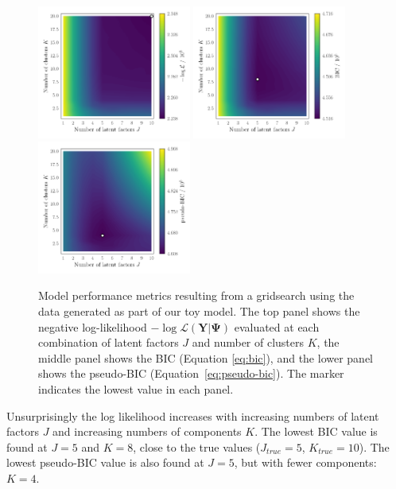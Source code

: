 \documentclass[twocolumn]{aastex61}
\newcommand{\vect}[1]{\boldsymbol{\mathbf{#1}}}
\renewcommand{\vec}[1]{\vect{#1}}
\newcommand{\data}{\textbf{Y}}
\newcommand{\NumLatentFactors}{J}
\newcommand{\NumComponents}{K}
\begin{document}
\begin{figure}
	\includegraphics[width=0.45\textwidth]{experiments/toy-ll-contours.png}
	\includegraphics[width=0.45\textwidth]{experiments/toy-bic-contours.png}
	\includegraphics[width=0.45\textwidth]{experiments/toy-pseudobic-contours.png}
    \caption{Model performance metrics resulting from a gridsearch using the
    		 data generated as part of our toy model. The top 
		 	 panel shows the negative log-likelihood 
			 $-\log{\mathcal{L}\left(\data|\vec\Psi\right)}$ 
			 evaluated at each combination of latent factors $J$ and number 
			 of clusters $K$, the middle panel shows the BIC (Equation \ref{eq:bic}), 
			 and the lower panel shows
			 the pseudo-BIC
			 (Equation~\ref{eq:pseudo-bic}). The marker indicates the 
			 lowest value in each panel.}
    \label{fig:experiment-1-gridsearch}
\end{figure}




Unsurprisingly the log likelihood increases with increasing numbers of latent
factors $\NumLatentFactors$ and increasing numbers of components $\NumComponents$.
The lowest BIC value is found at $\NumLatentFactors = 5$
and $\NumComponents = 8$, close to the true values ($\NumLatentFactors_{true} = 5$,
$\NumComponents_{true} = 10$). The lowest pseudo-BIC value is also found at
$\NumLatentFactors = 5$, but with fewer components: $\NumComponents = 4$.
\end{document}

